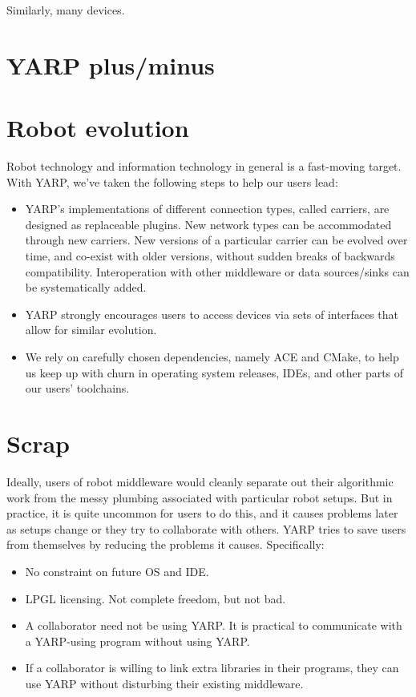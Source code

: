 \documentclass[letterpaper]{article}
\begin{document}
Similarly, many devices.


\section{YARP plus/minus}


\section{Robot evolution}

Robot technology and information technology in general is a
fast-moving target.  With YARP, we've taken the following steps to
help our users lead:

\begin{itemize}

\item YARP's implementations of different connection types, called
carriers, are designed as replaceable plugins.  New network types can
be accommodated through new carriers.  New versions of a particular
carrier can be evolved over time, and co-exist with older versions,
without sudden breaks of backwards compatibility.  Interoperation
with other middleware or data sources/sinks can be systematically
added.

\item YARP strongly encourages users to access devices via sets of
interfaces that allow for similar evolution.

\item We rely on carefully chosen dependencies, namely ACE and CMake,
to help us keep up with churn in operating system releases, IDEs, and
other parts of our users' toolchains.

\end{itemize}

\section{Scrap}


Ideally, users of robot middleware would cleanly separate out their
algorithmic work from the messy plumbing associated with particular
robot setups.  But in practice, it is quite uncommon for users to do
this, and it causes problems later as setups change or they try to
collaborate with others.  YARP tries to save users from themselves
by reducing the problems it causes.  Specifically:

\begin{itemize}

\item No constraint on future OS and IDE.

\item LPGL licensing.  Not complete freedom, but not bad.

\item A collaborator need not be using YARP.  It is practical to
communicate with a YARP-using program without using YARP.

\item If a collaborator is willing to link extra libraries in their
programs, they can use YARP without disturbing their existing
middleware.

\end{itemize}
\end{document}
